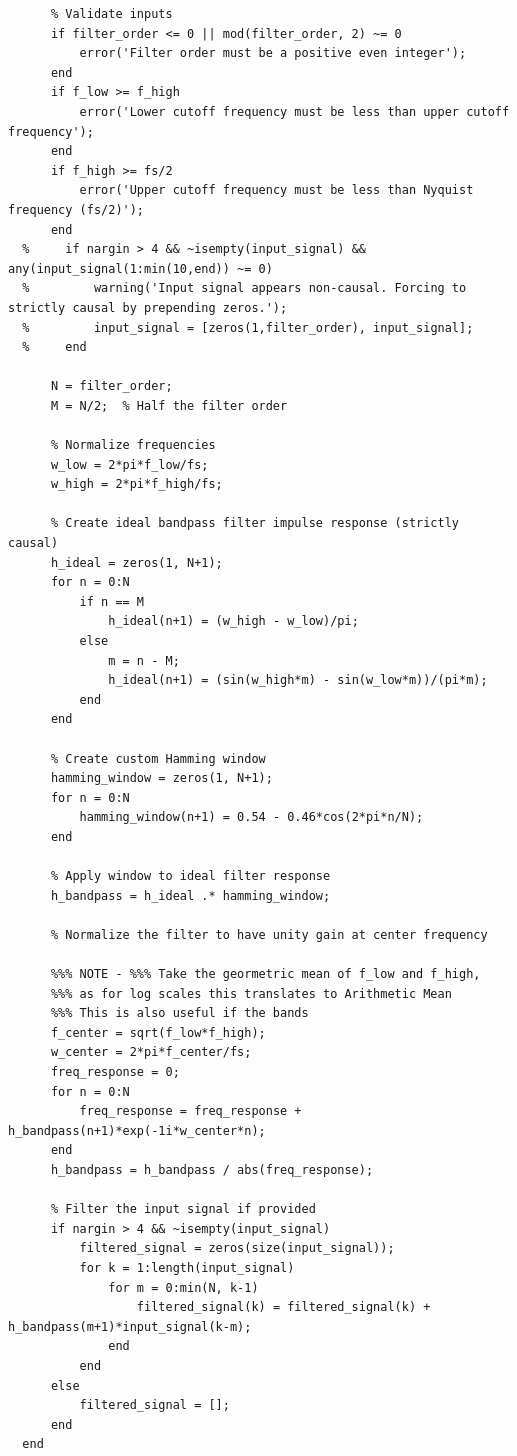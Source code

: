 \documentclass[12pt]{report}
\begin{document}
\begin{lstlisting}
      % Validate inputs
      if filter_order <= 0 || mod(filter_order, 2) ~= 0
          error('Filter order must be a positive even integer');
      end
      if f_low >= f_high
          error('Lower cutoff frequency must be less than upper cutoff frequency');
      end
      if f_high >= fs/2
          error('Upper cutoff frequency must be less than Nyquist frequency (fs/2)');
      end
  %     if nargin > 4 && ~isempty(input_signal) && any(input_signal(1:min(10,end)) ~= 0)
  %         warning('Input signal appears non-causal. Forcing to strictly causal by prepending zeros.');
  %         input_signal = [zeros(1,filter_order), input_signal];
  %     end
      
      N = filter_order;
      M = N/2;  % Half the filter order
      
      % Normalize frequencies
      w_low = 2*pi*f_low/fs;
      w_high = 2*pi*f_high/fs;
      
      % Create ideal bandpass filter impulse response (strictly causal)
      h_ideal = zeros(1, N+1);
      for n = 0:N
          if n == M
              h_ideal(n+1) = (w_high - w_low)/pi;
          else
              m = n - M;
              h_ideal(n+1) = (sin(w_high*m) - sin(w_low*m))/(pi*m);
          end
      end
      
      % Create custom Hamming window
      hamming_window = zeros(1, N+1);
      for n = 0:N
          hamming_window(n+1) = 0.54 - 0.46*cos(2*pi*n/N);
      end
      
      % Apply window to ideal filter response
      h_bandpass = h_ideal .* hamming_window;
      
      % Normalize the filter to have unity gain at center frequency
      
      %%% NOTE - %%% Take the geormetric mean of f_low and f_high, 
      %%% as for log scales this translates to Arithmetic Mean
      %%% This is also useful if the bands 
      f_center = sqrt(f_low*f_high); 
      w_center = 2*pi*f_center/fs;
      freq_response = 0;
      for n = 0:N
          freq_response = freq_response + h_bandpass(n+1)*exp(-1i*w_center*n);
      end
      h_bandpass = h_bandpass / abs(freq_response);
      
      % Filter the input signal if provided
      if nargin > 4 && ~isempty(input_signal)
          filtered_signal = zeros(size(input_signal));
          for k = 1:length(input_signal)
              for m = 0:min(N, k-1)
                  filtered_signal(k) = filtered_signal(k) + h_bandpass(m+1)*input_signal(k-m);
              end
          end
      else
          filtered_signal = [];
      end
  end



\end{lstlisting}
\end{document}
